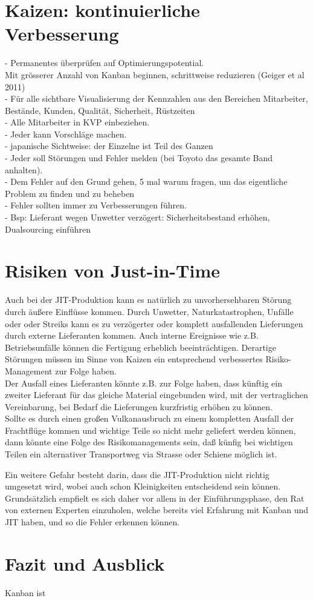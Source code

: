 \section{Kaizen: kontinuierliche Verbesserung}
- Permanentes überprüfen auf Optimierungspotential.\\
Mit grösserer Anzahl von Kanban beginnen, schrittweise reduzieren (Geiger et al 2011)\\
- Für alle sichtbare Visualisierung der Kennzahlen aus den Bereichen Mitarbeiter, Bestände, Kunden, Qualität, Sicherheit, Rüstzeiten\\
- Alle Mitarbeiter in KVP einbeziehen.\\
- Jeder kann Vorschläge machen.\\
- japanische Sichtweise: der Einzelne ist Teil des Ganzen\\
- Jeder soll Störungen und Fehler melden (bei Toyoto das gesamte Band anhalten).\\
- Dem Fehler auf den Grund gehen, 5 mal warum fragen, um das eigentliche Problem zu finden und zu beheben\\
- Fehler sollten immer zu Verbesserungen führen.\\
- Bsp: Lieferant wegen Unwetter verzögert: Sicherheitsbestand erhöhen, Dualsourcing einführen\\

\section{Risiken von Just-in-Time}
Auch bei der JIT-Produktion kann es natürlich zu unvorhersehbaren Störung durch äußere Einflüsse kommen.
Durch Unwetter, Naturkatastrophen, Unfälle oder oder Streiks kann es zu verzögerter oder komplett ausfallenden Lieferungen durch externe Lieferanten kommen.
Auch interne Ereignisse wie z.B. Betriebsunfälle können die Fertigung erheblich beeinträchtigen.
Derartige Störungen müssen im Sinne von Kaizen ein entsprechend verbessertes Risiko-Management zur Folge haben.\\
Der Ausfall eines Lieferanten könnte z.B. zur Folge haben, dass künftig ein zweiter Lieferant für das 
gleiche Material eingebunden wird, mit der vertraglichen Vereinbarung, bei Bedarf die Lieferungen kurzfristig erhöhen zu können.\\
Sollte es durch einen großen Vulkanausbruch zu einem kompletten Ausfall der Frachtflüge kommen und 
wichtige Teile so nicht mehr geliefert werden können, dann könnte eine Folge des Risikomanagements sein, 
daß künfig bei wichtigen Teilen ein alternativer Transportweg via Strasse oder Schiene möglich ist.

Ein weitere Gefahr besteht darin, dass die JIT-Produktion nicht richtig umgesetzt wird, wobei auch schon Kleinigkeiten entscheidend sein können.
Grundsätzlich empfielt es sich daher vor allem in der Einführungsphase, den Rat von externen Experten einzuholen, 
welche bereits viel Erfahrung mit Kanban und JIT haben, und so die Fehler erkennen können.

\section{Fazit und Ausblick}
Kanban ist 

